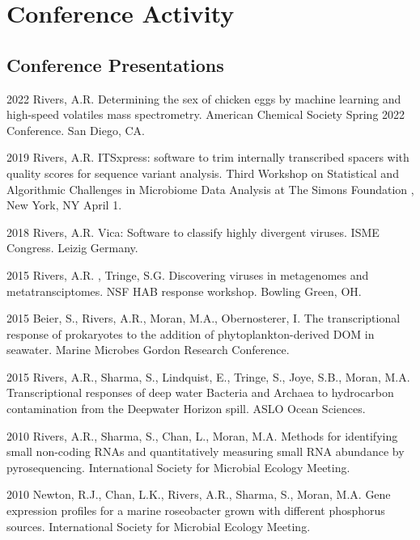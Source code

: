 \documentclass[12pt,letterpaper]{report}
\begin{document}
  
    \section*{Conference Activity}


    \subsection*{Conference Presentations}

    \begin{tablist}
    
\item[2022 ] \tab Rivers, A.R.  Determining the sex of chicken eggs by machine learning and high-speed volatiles mass spectrometry. American Chemical Society Spring 2022 Conference. San Diego, CA.
    	
\item[2019 ] \tab Rivers, A.R. ITSxpress: software to trim internally transcribed spacers with quality scores for sequence variant analysis. Third Workshop on Statistical and Algorithmic Challenges in Microbiome Data Analysis at The Simons Foundation , New York, NY April 1. 

\item[2018 ] \tab Rivers, A.R. Vica: Software to classify highly divergent viruses. ISME Congress. Leizig Germany.

\item[2015 ] \tab Rivers, A.R. , Tringe, S.G. Discovering viruses in metagenomes and metatransciptomes. NSF HAB response workshop. Bowling Green, OH.

\item[2015 ] \tab  Beier, S., Rivers, A.R., Moran, M.A., Obernosterer, I. The transcriptional response of prokaryotes to the addition of phytoplankton-derived DOM in seawater. Marine Microbes Gordon Research Conference. 

\item[2015] \tab Rivers, A.R., Sharma, S., Lindquist, E., Tringe, S., Joye, S.B., Moran, M.A.  Transcriptional responses of deep water Bacteria and Archaea to hydrocarbon contamination from the Deepwater Horizon spill. ASLO Ocean Sciences. 

\item[2010] \tab Rivers, A.R., Sharma, S., Chan, L., Moran, M.A. Methods for identifying small non-coding RNAs and quantitatively measuring small RNA abundance by pyrosequencing. International Society for Microbial Ecology Meeting.

\item[2010] \tab Newton, R.J., Chan, L.K., Rivers, A.R., Sharma, S., Moran, M.A.  Gene expression profiles for a marine roseobacter grown with different phosphorus sources. International Society for Microbial Ecology Meeting.


\end{tablist}
\end{document}
